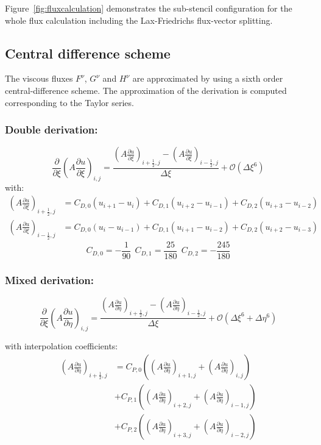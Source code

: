 Figure~\ref{fig:fluxcalculation} demonstrates the sub-stencil configuration for the whole flux calculation including the Lax-Friedrichs flux-vector splitting.

\subsection{Central difference scheme}
The viscous fluxes $F^\nu$, $G^\nu$ and $H^\nu$ are approximated by using a sixth order central-difference scheme. 
The approximation of the derivation is computed corresponding to the Taylor series.
\subsubsection{Double derivation:}
\begin{equation}
\frac{\partial}{\partial \xi} \left(A \frac{\partial u}{\partial \xi}\right)_{i,j}=\frac{\left(A \frac{\partial u}{\partial \xi}\right)_{i+\frac{1}{2},j}-\left(A \frac{\partial u}{\partial \xi}\right)_{i-\frac{1}{2},j}}{\varDelta \xi}
+\mathcal O\left(\varDelta \xi^{6}\right)
\end{equation}
with:
\begin{eqnarray}
\left(A \frac{\partial u}{\partial \xi}\right)_{i+\frac{1}{2},j}&=C_{D,0}\left(u_{i+1}-u_{i} \right)+C_{D,1}\left(u_{i+2}-u_{i-1} \right)+C_{D,2}\left(u_{i+3}-u_{i-2} \right)
\\
\left(A \frac{\partial u}{\partial \xi}\right)_{i-\frac{1}{2},j}&=C_{D,0}\left(u_{i}-u_{i-1} \right)+C_{D,1}\left(u_{i+1}-u_{i-2} \right)+C_{D,2}\left(u_{i+2}-u_{i-3} \right)
\end{eqnarray}
\begin{equation}
C_{D,0}=-\frac{1}{90}\ \ 
C_{D,1}=\frac{25}{180}\ \ 
C_{D,2}=-\frac{245}{180}
\end{equation}

\subsubsection{Mixed derivation:}
\begin{equation}
\frac{\partial}{\partial \xi} \left(A\frac{\partial u}{ \partial \eta}\right)_{i,j}=
\frac{ \left( A\frac{\partial u}{\partial \eta}\right)_{i+\frac{1}{2},j} - \left( A\frac{\partial u}{\partial \eta}\right)_{i-\frac{1}{2},j}}{\varDelta \xi}
+\mathcal O\left(\varDelta \xi^{6}+\varDelta \eta^{6}\right)
\end{equation}

with interpolation coefficients:
\begin{eqnarray}
\left( A\frac{\partial u}{\partial \eta}\right)_{i+\frac{1}{2},j}&=
C_{P,0}\left(\left( A\frac{\partial u}{\partial \eta}\right)_{i+1,j}+\left( A\frac{\partial u}{\partial \eta}\right)_{i,j} \right)\\ \nonumber
&+C_{P,1}\left(\left( A\frac{\partial u}{\partial \eta}\right)_{i+2,j}+\left( A\frac{\partial u}{\partial \eta}\right)_{i-1,j} \right)\\ \nonumber
&+C_{P,2}\left(\left( A\frac{\partial u}{\partial \eta}\right)_{i+3,j}+\left( A\frac{\partial u}{\partial \eta}\right)_{i-2,j} \right)
\end{eqnarray}

